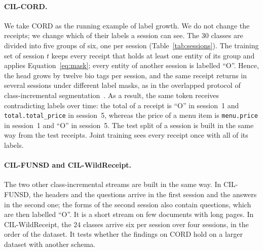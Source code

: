 \paragraph{CIL-CORD.} We take CORD as the running example of label growth. We do not change
the receipts; we change which of their labels a session can see. The $30$ classes are
divided into five groups of six, one per session (Table~\ref{tab:sessions}). The training
set of session $t$ keeps every receipt that holds at least one entity of its group and
applies Equation~\eqref{eq:mask}; every entity of another session is labelled ``O''. Hence,
the head grows by twelve \gls{bio} tags per session, and the same receipt returns in several
sessions under different label masks, as in the overlapped protocol of class-incremental
segmentation~\citep{cermelli2020mib}. As a result, the same token receives contradicting
labels over time: the total of a receipt is ``O'' in session~1 and
\texttt{total.total\_price} in session~5, whereas the price of a menu item is
\texttt{menu.price} in session~1 and ``O'' in session~5. The test split of a session is
built in the same way from the test receipts. Joint training sees every receipt once with
all of its labels.

\paragraph{CIL-FUNSD and CIL-WildReceipt.} The two other class-incremental streams are
built in the same way. In CIL-FUNSD, the headers and the questions arrive in the first
session and the answers in the second one; the forms of the second session also contain
questions, which are then labelled ``O''. It is a short stream on few documents with long
pages. In CIL-WildReceipt, the $24$ classes arrive six per session over four sessions, in
the order of the dataset. It tests whether the findings on CORD hold on a larger dataset
with another schema.


